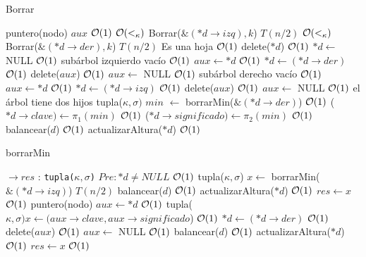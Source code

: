 \begin{Algoritmos}
\begin{algorithm}
\caption{Borrar}
\begin{algorithmic}[1]
	\State puntero(nodo) $aux$
	\Comment $\mathcal{O}(1)$
	\Comment $\mathcal{O}(<_{\kappa})$
		\State Borrar($\&(*d\to izq), k$)
		\Comment $T(n/2)$
	\Else 
		\Comment $\mathcal{O}(<_{\kappa})$
			\State Borrar($\&(*d\to der), k$)
			\Comment $T(n/2)$
		\Else 
				\Comment Es una hoja $\mathcal{O}(1)$
				\State delete($*d$)
				\Comment $\mathcal{O}(1)$
				\State $*d\gets$ NULL
				\Comment $\mathcal{O}(1)$
			\Else
					\Comment subárbol izquierdo vacío $\mathcal{O}(1)$
					\State $aux \gets *d$
					\Comment $\mathcal{O}(1)$
					\State $*d\gets (*d\to der)$
					\Comment $\mathcal{O}(1)$
					\State delete($aux$)
					\Comment $\mathcal{O}(1)$
					\State $aux \gets$ NULL
					\Comment $\mathcal{O}(1)$
				\Else
						\Comment subárbol derecho vacío $\mathcal{O}(1)$
						\State $aux \gets *d$
						\Comment $\mathcal{O}(1)$
						\State $*d\gets (*d\to izq)$
						\Comment $\mathcal{O}(1)$
						\State delete($aux$)
						\Comment $\mathcal{O}(1)$
						\State $aux \gets$ NULL
						\Comment $\mathcal{O}(1)$
					\Else
						\Comment el árbol tiene dos hijos
						\State tupla($\kappa, \sigma)$ $min$ $\gets$ borrarMin($\&(*d\to der)$)
						\Comment $\mathcal{O}(1)$
						\State($*d\to clave) \gets \pi_1(min)$
						\Comment $\mathcal{O}(1)$
						\State($*d\to significado) \gets \pi_2(min)$
						\Comment $\mathcal{O}(1)$
					\EndIf
				\EndIf
			\EndIf 
		\EndIf
	\EndIf
	\State balancear($d$)
	\Comment $\mathcal{O}(1)$
	\State actualizarAltura($*d$)
	\Comment $\mathcal{O}(1)$
\EndProcedure
\end{algorithmic}
\end{algorithm}

\begin{algorithm}
\caption{borrarMin}
\begin{algorithmic}[1]
$\to res$ : \texttt{tupla($\kappa, \sigma$)}
	\Comment $Pre: *d \neq NULL$
	\Comment $\mathcal{O}(1)$
		\State tupla($\kappa, \sigma$) $x\gets$ borrarMin($\&(*d\to izq)$)
		\Comment $T(n/2)$
		\State balancear($d$)
		\Comment $\mathcal{O}(1)$
		\State actualizarAltura($*d$)
		\Comment $\mathcal{O}(1)$
		\State $res \gets x$
		\Comment $\mathcal{O}(1)$
	\Else
		\State puntero(nodo) $aux \gets *d$
		\Comment $\mathcal{O}(1)$
		\State tupla($\kappa, \sigma) x \gets (aux\to clave, aux\to significado$)
		\Comment $\mathcal{O}(1)$
		\State $*d\gets (*d\to der)$
		\Comment $\mathcal{O}(1)$
		\State delete($aux$)
		\Comment $\mathcal{O}(1)$
		\State $aux \gets$ NULL
		\Comment $\mathcal{O}(1)$
		\State balancear($d$)
		\Comment $\mathcal{O}(1)$
		\State actualizarAltura($*d$)
		\Comment $\mathcal{O}(1)$
		\State $res \gets x$
		\Comment $\mathcal{O}(1)$
	\EndIf
\EndProcedure
\end{algorithmic}
\end{algorithm}

\end{Algoritmos}
